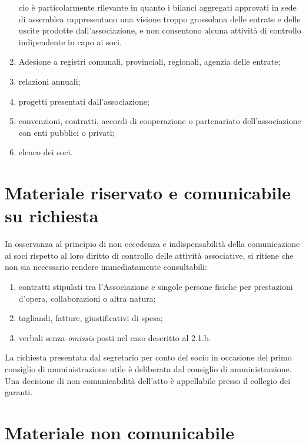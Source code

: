\begin{enumerate}
\begin{itemize}
        \end{itemize}
        cio è particolarmente rilevante in quanto i bilanci aggregati
        approvati in sede di assemblea rappresentano una visione troppo
        grossolana delle entrate e delle uscite prodotte dall'associazione, e
        non consentono alcuna attività di controllo indipendente in capo ai
        soci.
    \item
        Adesione a registri comunali, provinciali, regionali, agenzia delle
        entrate;
    \item
        relazioni annuali;
    \item
        progetti presentati dall'associazione;
    \item
        convenzioni, contratti, accordi di cooperazione o partenariato
        dell'associazione con enti pubblici o privati;
    \item
        elenco dei soci.
\end{enumerate}

\section{Materiale riservato e comunicabile su
richiesta}\label{materiale-riservato-e-comunicabile-su-richiesta}

In osservanza al principio di non eccedenza e indispensabilità della
comunicazione ai soci rispetto al loro diritto di controllo delle
attività associative, si ritiene che non sia necessario rendere
immediatamente consultabili:

\begin{enumerate}
    \item
        contratti stipulati tra l'Associazione e singole persone fisiche per
        prestazioni d'opera, collaborazioni o altra natura;
    \item
        tagliandi, fatture, giustificativi di spesa;
    \item
        verbali senza \emph{omissis} posti nel caso descritto al 2.1.b.
\end{enumerate}

La richiesta presentata dal segretario per conto del socio in occasione
del primo consiglio di amministrazione utile è deliberata dal consiglio
di amministrazione. Una decisione di non comunicabilità dell'atto è
appellabile presso il collegio dei garanti.

\section{Materiale non comunicabile}\label{materiale-non-comunicabile}

